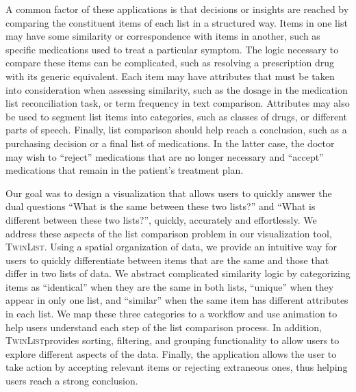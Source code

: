 \documentclass{chi2009}
\newcommand{\TwinList}{\textsc{TwinList}}
\begin{document}
A common factor of these applications is that decisions or insights are reached by comparing the constituent items of each list in a structured way. Items in one list may have some similarity or correspondence with items in another, such as specific medications used to treat a particular symptom. The logic necessary to compare these items can be complicated, such as resolving a prescription drug with its generic equivalent. Each item may have attributes that must be taken into consideration when assessing similarity, such as the dosage in the medication list reconciliation task, or term frequency in text comparison. Attributes may also be used to segment list items into categories, such as classes of drugs, or different parts of speech. Finally, list comparison should help reach a conclusion, such as a purchasing decision or a final list of medications. In the latter case, the doctor may wish to ``reject'' medications that are no longer necessary and ``accept'' medications that remain in the patient's treatment plan.

Our goal was to design a visualization that allows users to quickly answer the dual questions ``What is the same between these two lists?'' and ``What is different between these two lists?'', quickly, accurately and effortlessly. We address these aspects of the list comparison problem in our visualization tool, \TwinList. Using a spatial organization of data, we provide an intuitive way for users to quickly differentiate between items that are the same and those that differ in two lists of data. We abstract complicated similarity logic by categorizing items as ``identical'' when they are the same in both lists, ``unique'' when they appear in only one list, and ``similar'' when the same item has different attributes in each list. We map these three categories to a workflow and use animation to help users understand each step of the list comparison process. In addition, \TwinList provides sorting, filtering, and grouping functionality to allow users to explore different aspects of the data. Finally, the application allows the user to take action by accepting relevant items or rejecting extraneous ones, thus helping users reach a strong conclusion. 
\end{document}
